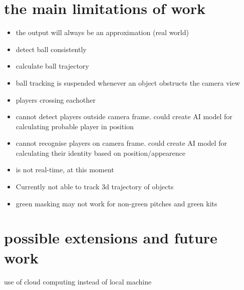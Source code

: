 \documentclass[
11pt,
twoside
]{report}
\begin{document}
\section{the main limitations of work}

\begin{itemize}
\item
  the output will always be an approximation (real world)
\item
  detect ball consistently
\item
  calculate ball trajectory
\item
  ball tracking is suspended whenever an object obstructs the camera
  view
\item
  players crossing eachother
\item
  cannot detect players outside camera frame. could create AI model for
  calculating probable player in position
\item
  cannot recognise players on camera frame. could create AI model for
  calculating their identity based on position/appearence
\item
  is not real-time, at this moment
\item
  Currently not able to track 3d trajectory of objects
\item
  green masking may not work for non-green pitches and green kits
\end{itemize}



\section{possible extensions and future work}

use of cloud computing instead of local machine
\end{document}
